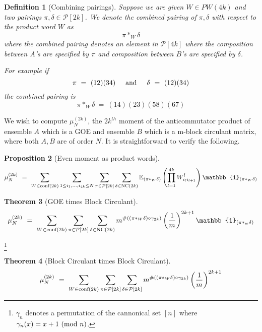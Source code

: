 \documentclass[12pt,reqno]{amsart}
\theoremstyle{plain} %
\newtheorem{theorem}{Theorem}[section]
\newtheorem{prop}[theorem]{Proposition}
\newtheorem{definition}[theorem]{Definition}
\theoremstyle{remark}
\theoremstyle{definition}
\renewcommand{\mod}[1]{\textup{ (mod~$#1$)}}
\begin{document}
\begin{definition}[Combining pairings]
    Suppose we are given $W \in PW(4k)$ and two pairings 
    $\pi, \delta \in \mathcal{P}[2k]$. We denote the 
    combined pairing of $\pi, \delta$ with respect 
    to the product word $W$ as 
    \[
        \pi *_W \delta
    \]
    where the combined pairing denotes an element in $\mathcal{P}[4k]$ 
    where the composition between $A$'s are specified by $\pi$ and 
    composition between $B$'s are specified by $\delta$. 

    For example if 
    \[
    \pi \ = \ (1 2) (3 4) { \hspace{5mm} \textrm{and} \hspace{5mm} } 
    \delta \ = \ (12) (34)
    \]
    the combined pairing is 
    \[
    \pi *_W \delta \ = \ (1 4)(2 3)(5 8)(67)
    \]
\end{definition}
    


We wish to compute $\mu_N^{(2k)}$, the $2k^{th}$ moment of 
the anticommutator product of ensemble $A$ which is a GOE 
and ensemble $B$ which is a m-block circulant matrix, 
where both $A, B$ are of order $N$. It is straightforward to 
verify the following. 

\begin{prop}[Even moment as product words]
    \label{thm:baseForm}
    \begin{equation}
        \mu_N^{(2k)} \ = \ 
        \sum_{W\in \PW(2k)}
        \sum_{1 \leq i_1 , \dots, i_{4k} \leq N}
        \sum_{\pi \in \mathcal P[2k]}  
        \sum_{\delta \in \NC(2k)}  
        \mathbb{E}_{(\pi*_W\delta)}\left(
        \prod_{l = 1}^{4k} W^{l}_{i_l i_{l + 1}}
        \right) \mathbb{1}_{(\pi*_W\delta)}
    \end{equation}
\end{prop}

\begin{theorem}[GOE times Block Circulant]
    \label{thm: GOEBC}
    \begin{equation}
        \mu_N^{(2k)} \ = \ 
        \sum_{W \in \PW(2k)}
        \sum_{\pi \in \mathcal P[2k]}  
        \sum_{\delta \in \NC(2k)}   
        m^{
            \#((\pi *_W \delta) \circ \gamma_{2k} )
        }
        \left(
            \frac 1 m
        \right)^{2k + 1}
        \mathbb{1}_{(\pi*_w\delta)}
    \end{equation}
\end{theorem}
\footnote{
    $\gamma_n$ denotes a permutation of the cannonical set $[n]$ 
    where $\gamma_n(x) = x + 1 \mod n$. 
}

\begin{theorem}[Block Circulant times Block Circulant]
    \label{thm:BCBC}
    \begin{equation}
        \mu_N^{(2k)} \ = \ 
        \sum_{W \in \PW(2k)}
        \sum_{\pi \in \mathcal P[2k]}  
        \sum_{\delta \in  \mathcal P[2k]}   
        m^{
            \#((\pi *_W \delta) \circ \gamma_{2k} )
        }
        \left(
            \frac 1 m
        \right)^{2k + 1}
    \end{equation}
\end{theorem}
\end{document}
